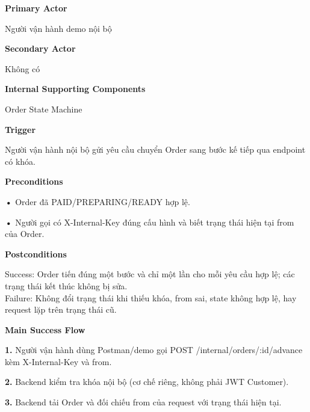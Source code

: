 \documentclass[11pt,a4paper,oneside]{report}
\begin{document}
\par\smallskip\noindent\textcolor{sgublue}{\textbf{Primary Actor}}\par\nobreak
Người vận hành demo nội bộ
\par

\par\smallskip\noindent\textcolor{sgublue}{\textbf{Secondary Actor}}\par\nobreak
Không có
\par

\par\smallskip\noindent\textcolor{sgublue}{\textbf{Internal Supporting Components}}\par\nobreak
Order State Machine
\par

\par\smallskip\noindent\textcolor{sgublue}{\textbf{Trigger}}\par\nobreak
Người vận hành nội bộ gửi yêu cầu chuyển Order sang bước kế tiếp qua endpoint có khóa.
\par

\par\smallskip\noindent\textcolor{sgublue}{\textbf{Preconditions}}\par\nobreak
\textbf{•} Order đã PAID/PREPARING/READY hợp lệ.

\textbf{•} Người gọi có X-Internal-Key đúng cấu hình và biết trạng thái hiện tại from của Order.
\par

\par\smallskip\noindent\textcolor{sgublue}{\textbf{Postconditions}}\par\nobreak
Success: Order tiến đúng một bước và chỉ một lần cho mỗi yêu cầu hợp lệ; các trạng thái kết thúc không bị sửa.\\
Failure: Không đổi trạng thái khi thiếu khóa, from sai, state không hợp lệ, hay request lặp trên trạng thái cũ.\strut
\par

\par\smallskip\noindent\textcolor{sgublue}{\textbf{Main Success Flow}}\par\nobreak
\textbf{1.} Người vận hành dùng Postman/demo gọi POST /internal/orders/:id/advance kèm X-Internal-Key và from.

\textbf{2.} Backend kiểm tra khóa nội bộ (cơ chế riêng, không phải JWT Customer).

\textbf{3.} Backend tải Order và đối chiếu from của request với trạng thái hiện tại.
\end{document}
